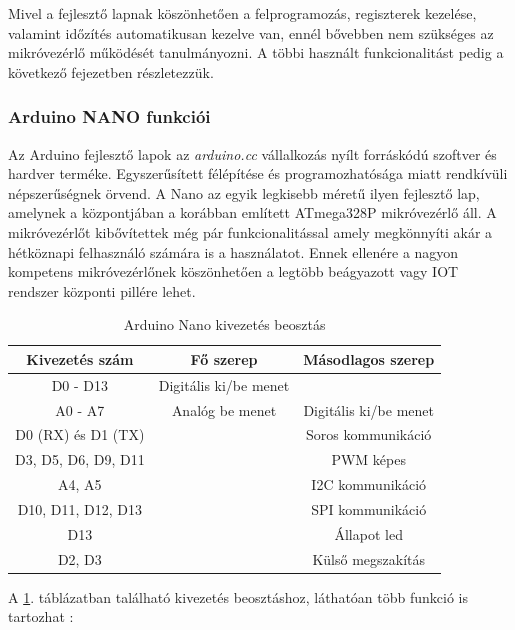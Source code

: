 \documentclass[a4paper,12pt]{article}
\begin{document}
Mivel a fejlesztő lapnak köszönhetően a felprogramozás, regiszterek kezelése, valamint időzítés automatikusan kezelve van, ennél bővebben nem szükséges az mikróvezérlő működését tanulmányozni.
A többi használt funkcionalitást pedig a következő fejezetben részletezzük.

\subsubsection{Arduino NANO funkciói}
Az Arduino fejlesztő lapok az \textit{arduino.cc} vállalkozás nyílt forráskódú szoftver és hardver terméke.
Egyszerűsített félépítése és programozhatósága miatt rendkívüli népszerűségnek örvend.
A Nano az egyik legkisebb méretű ilyen fejlesztő lap, amelynek a központjában a korábban említett ATmega328P mikróvezérlő áll.
A mikróvezérlőt kibővítettek még pár funkcionalitással amely megkönnyíti akár a hétköznapi felhasználó számára is a használatot.
Ennek ellenére a nagyon kompetens mikróvezérlőnek köszönhetően a legtöbb beágyazott vagy IOT rendszer központi pillére lehet.

\begin{table}[!htbp]
    \centering
    \begin{tabular}{|c|c|c|}\hline
        Kivezetés szám & Fő szerep & Másodlagos szerep\\ \hline
        D0 - D13 & Digitális ki/be menet &  \\ \hline
		A0 - A7 & Analóg be menet & Digitális ki/be menet \\ \hline
        D0 (RX) és D1 (TX)  & & Soros kommunikáció \\ \hline
        D3, D5, D6, D9, D11 & & PWM képes \\ \hline
		A4, A5 &  & I2C kommunikáció \\ \hline
		D10, D11, D12, D13 &  & SPI kommunikáció \\ \hline
		D13 &  & Állapot led\\ \hline
		D2, D3 &  & Külső megszakítás \\ \hline
    \end{tabular}
    \caption[Arduino Nano pin beosztás]{Arduino Nano kivezetés beosztás}
    \label{tab:arduino_pint_out}
\end{table}

A \ref{tab:arduino_pint_out}. táblázatban található kivezetés beosztáshoz, láthatóan több funkció is tartozhat \cite{adaq18}:
\end{document}
